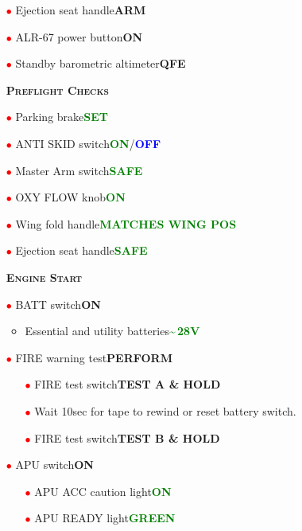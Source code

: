 \documentclass[a4paper,12pt,dvipsnames]{letter}
\newcommand{\button}[1]{\textbf{#1}}
\newcommand{\ok}[1]{\textcolor{Green}{\textbf{#1}}}
\newcommand{\boat}[1]{\textcolor{Blue}{\textbf{#1}}}
\newcommand{\myHead}[1]{{\LARGE\textsc{\textbf{#1}}}}
\newcommand{\ri}{\textcolor{red}{$\bullet$\;}}
\begin{document}
{\begin{itemize}
 \item[\ri] Ejection seat handle\dotfill\button{ARM}
 \item[\ri] ALR-67 power button\dotfill\button{ON}  
 \item[\ri] Standby barometric altimeter\dotfill\button{QFE}
\end{itemize}
\newpage
\begin{itemize}
 \item[] \myHead{Preflight Checks}
 \item[\ri] Parking brake\dotfill\ok{SET}
 \item[\ri] ANTI SKID switch\dotfill\ok{ON}/\boat{OFF}
 \item[\ri] Master Arm switch\dotfill\ok{SAFE}
 \item[\ri] OXY FLOW knob\dotfill\ok{ON}
 \item[\ri] Wing fold handle\dotfill\ok{MATCHES WING POS}
 \item[\ri] Ejection seat handle\dotfill\ok{SAFE}
\end{itemize}
\begin{itemize}
 \item[] \myHead{Engine Start} 
 \item[\ri] BATT switch\dotfill\button{ON}
 \begin{itemize}
  \item Essential and utility batteries\dotfill\ok{\textasciitilde\,28\;V}
 \end{itemize}
 \item[\ri] FIRE warning test\dotfill\button{PERFORM}
 \begin{itemize}
  \item[\ri] FIRE test switch\dotfill\button{TEST A \& HOLD}
  \item[\ri] Wait 10\;sec for tape to rewind or reset battery switch.
  \item[\ri] FIRE test switch\dotfill\button{TEST B \& HOLD}
 \end{itemize}
 \item[\ri] APU switch\dotfill\button{ON}
 \begin{itemize}
  \item[\ri] APU ACC caution light\dotfill\ok{ON}
  \item[\ri] APU READY light\dotfill\ok{GREEN}

\end{itemize}
\end{itemize}}
\end{document}
